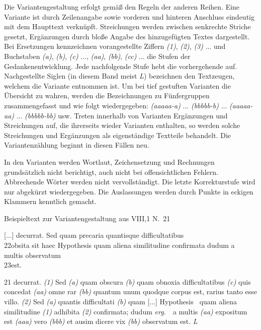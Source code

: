 Die Variantengestaltung erfolgt gem\"{a}{\ss} den Regeln der anderen Reihen. Eine Variante ist durch Zeilenangabe sowie vorderen und hinteren Anschluss eindeutig mit dem Haupttext verkn\"{u}pft. Streichungen werden zwischen senkrechte Striche gesetzt, Erg\"{a}nzungen durch blo{\ss}e Angabe des hinzugef\"{u}gten Textes dargestellt. Bei Ersetzungen kennzeichnen vorangestellte Ziffern \textit{(1)}, \textit{(2)}, \textit{(3)} ... und Buchstaben \textit{(a)}, \textit{(b)}, \textit{(c)} ..., \textit{(aa)}, \textit{(bb)}, \textit{(cc)} ... die Stufen der Gedankenentwicklung. Jede nachfolgende Stufe hebt die vorhergehende auf. Nachgestellte Siglen (in diesem Band meist \textit{L}) bezeichnen den Textzeugen, welchem die Variante entnommen ist. Um bei tief gestuften Varianten die \"{U}bersicht zu wahren, werden die Bezeichnungen zu F\"{u}nfergruppen zusammengefasst und wie folgt wiedergegeben: \textit{(aaaaa-a)} ... \textit{(bbbbb-b)} ... \textit{(aaaaa-aa)} ... \textit{(bbbbb-bb)} usw. Treten innerhalb von Varianten Erg\"{a}nzungen und Streichungen auf, die ihrerseits wieder Varianten enthalten, so werden solche Streichungen und Erg\"{a}nzungen als eigenst\"{a}ndige Textteile behandelt. Die Variantenz\"{a}hlung beginnt in diesen F\"{a}llen neu.\par
In den Varianten werden Wortlaut, Zeichensetzung und Rechnungen grunds\"{a}tzlich nicht berichtigt, auch nicht bei offensichtlichen Fehlern. Abbrechende W\"{o}rter werden nicht vervollst\"{a}ndigt. Die letzte Korrekturstufe wird nur abgek\"{u}rzt wiedergegeben. Die Auslassungen werden durch Punkte in eckigen Klammern kenntlich gemacht.\par\vspace{2.0ex}
\noindent Beispieltext zur Variantengestaltung aus VIII,1 N.~21\par\vspace{1.0ex}
\hspace{1cm}[...] decurrat. Sed quam precaria quantisque difficultatibus\\
22\hspace{1cm}obsita sit haec Hypothesis quam aliena similitudine confirmata dudum a\\ multis observatum\\
23\hspace{1cm}est.\par\vspace{0.5cm}
\noindent \footnotesize 21 decurrat. \textit{(1)} Sed \textit{(a)} quam obscura \textit{(b)} quam obnoxia difficultatibus \textit{(c)} quis concedat \textit{(aa)} omne rar \textit{(bb)} quantum unum quodque corpus est, rarius tanto esse villo. \textit{(2)} Sed \textit{(a)} quantis difficultati \textit{(b)} quam [...] Hypothesis \textbar\ quam aliena similitudine \textit{(1)} adhibita \textit{(2)} confirmata; dudum \textit{erg.}\ \textbar\ a multis \textit{(aa)} expositum est \textit{(aaa)} vero \textit{(bbb)} et ausim dicere vix \textit{(bb)} observatum est. \textit{L}\par
